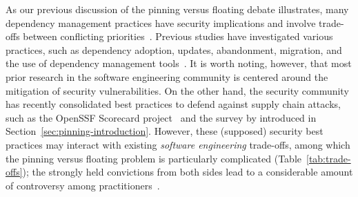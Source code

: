 As our previous discussion of the pinning versus floating debate illustrates, many dependency management practices have security implications and involve trade-offs between conflicting priorities~\cite{DBLP:conf/ccs/PashchenkoVM20}.
Previous studies have investigated various practices, such as dependency adoption, updates, abandonment, migration, and the use of dependency management tools~\cite[e.g.,][]{DBLP:journals/ese/KulaGOII18, DBLP:conf/sigsoft/VargasATBG20, DBLP:conf/sigsoft/HeHGZ21, DBLP:conf/sigsoft/MillerKV23, DBLP:journals/tse/HeHZZ23}.
It is worth noting, however, that most prior research in the software engineering community is centered around the mitigation of security vulnerabilities.
On the other hand, the security community has recently consolidated best practices to defend against supply chain attacks, such as the OpenSSF Scorecard project~\cite{DBLP:journals/ieeesp/ZahanKHSW23} and the survey by \citet{DBLP:conf/sp/LadisaPMB23} introduced in Section~\ref{sec:pinning-introduction}.
However, these (supposed) security best practices may interact with existing \emph{software engineering} trade-offs, among which the pinning versus floating problem is particularly complicated (Table~\ref{tab:trade-offs});  the strongly held convictions from both sides lead to a considerable amount of controversy among practitioners~\cite{facts-vs-feelings, renovate-pinning, pinning-only-work}.

